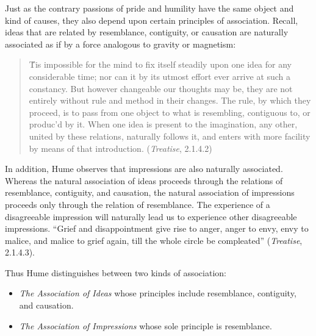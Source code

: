 Just as the contrary passions of pride and humility have the same object and kind of causes, they also depend upon certain principles of association. Recall, ideas that are related by resemblance, contiguity, or causation are naturally associated as if by a force analogous to gravity or magnetism:

\begin{quote}
    \'Tis impossible for the mind to fix itself steadily upon one idea for any considerable time; nor can it by its utmost effort ever arrive at such a constancy. But however changeable our thoughts may be, they are not entirely without rule and method in their changes. The rule, by which they proceed, is to pass from one object to what is resembling, contiguous to, or produc'd by it. When one idea is present to the imagination, any other, united by these relations, naturally follows it, and enters with more facility by means of that introduction. (\emph{Treatise}, 2.1.4.2)
\end{quote}

In addition, Hume observes that impressions are also naturally associated. Whereas the natural association of ideas proceeds through the relations of resemblance, contiguity, and causation, the natural association of impressions proceeds only through the relation of resemblance. The experience of a disagreeable impression will naturally lead us to experience other disagreeable impressions. ``Grief and disappointment give rise to anger, anger to envy, envy to malice, and malice to grief again, till the whole circle be compleated'' (\emph{Treatise}, 2.1.4.3).

Thus Hume distinguishes between two kinds of association:

\begin{itemize}
    \item \emph{The Association of Ideas} whose principles include resemblance, contiguity, and causation.
    \item \emph{The Association of Impressions} whose sole principle is resemblance.
\end{itemize}

\change

% 

